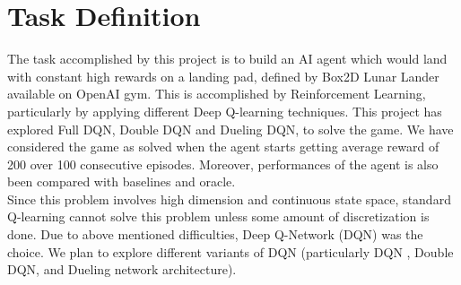 \section{Task Definition}
\label{intro}

The task accomplished by this project is to build an AI agent which would land with constant high rewards on a landing pad, defined by Box2D Lunar Lander available on OpenAI gym. This is accomplished by Reinforcement Learning, particularly by applying different Deep Q-learning techniques. This project has explored Full DQN, Double DQN and Dueling DQN, to solve the game. We have considered the game as solved when the agent starts getting average reward of 200 over 100 consecutive episodes. Moreover, performances of the agent is also been compared with baselines and oracle. \\

Since this problem involves high dimension and continuous state
space, standard Q-learning cannot solve this problem unless some amount of discretization is done. Due to above mentioned difficulties, Deep Q-Network (DQN) was the choice. We plan to explore different variants of DQN (particularly DQN , Double DQN, and
Dueling network architecture).



